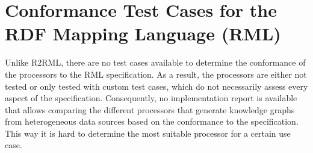 \section{Conformance Test Cases for the RDF Mapping Language (RML)}
\label{chapter5:sec-rml}

Unlike R2RML, there are no test cases available to determine the conformance of the processors to the RML specification. As a result, the processors are either not tested or only tested with custom test cases, which do not necessarily assess every aspect of the specification. Consequently, no implementation report is available that allows comparing the different processors that generate knowledge graphs from heterogeneous data sources
based on the conformance to the specification. This way it is hard to determine the most suitable processor for a certain use case.

